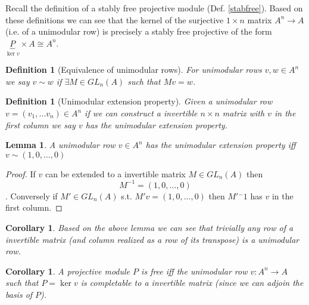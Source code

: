 \documentclass[12pt]{article}
\numberwithin{equation}{section}
\newcounter{dummy} \numberwithin{dummy}{section}
\newtheorem{definition}[dummy]{Definition}
\newtheorem{corollary}[dummy]{Corollary}
\newtheorem{lemma}[dummy]{Lemma}
\begin{document}
	Recall the definition of a stably free projective module (Def. \ref{stabfree}). Based on these definitions we can see that the kernel of the surjective $1 \times n $ matrix $A^n \to A$ (i.e. of a unimodular row) is precisely a stably free projective of the form $\underbrace{P}_{\ker v} \times A \cong A^n$.
	
	
	
	\begin{definition}[Equivalence of unimodular rows]
		For unimodular rows $v,w\in A^n$ we say $v \sim w $ if $\exists M \in GL_n(A)$ such that $Mv=w$.
	\end{definition}
	
	\begin{definition}[Unimodular extension property]
		Given a unimodular row $v=(v_1,\dots v_n) \in A^n$ if we can construct a invertible $n \times n $  matrix with $v$ in the first column we say $v$ has the unimodular extension property.
	\end{definition}
	

	
	\begin{lemma}
		A unimodular row $v \in A^n$ has the unimodular extension property iff $v \sim (1,0,\dots ,0)$
	\end{lemma}
	\begin{proof}
		If $v$ can be extended to a invertible matrix $M \in GL_n(A)$ then \[ M^{-1} = (1,0,\dots, 0) \].
		Conversely if $M' \in GL_n(A) $ s.t. $M'v=(1,0,\dots,0)$ then $M'{^-1}$ has $v$ in the first column.
	\end{proof}
		\begin{corollary}\label{row-of-inv-mat-unimod}
		Based on the above lemma we can see that trivially any row of a invertible matrix (and column realized as a row of its transpose) is a unimodular row. 
	\end{corollary}
	\begin{corollary}
		A projective module $P$ is free iff the unimodular row $v: A^n \to A$ such that $P=\ker v$ is completable to a invertible matrix (since we can adjoin the basis of $P$).
	\end{corollary}
	
\end{document}
